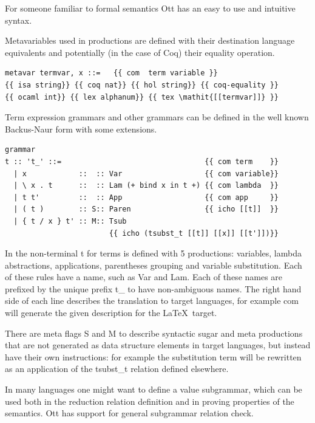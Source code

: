 \documentclass[12pt,twoside,notitlepage]{report}
\theoremstyle{plain}%
\theoremstyle{definition}
\theoremstyle{remark}
\begin{document}
For someone familiar to formal semantics Ott has an easy to use and intuitive syntax. 

Metavariables used in productions are defined with their destination language equivalents and potentially (in the case of Coq) their equality operation.

\begin{lstlisting}[language={Ott}, caption={Ott metavariable definition}]
metavar termvar, x ::=   {{ com  term variable }} 
{{ isa string}} {{ coq nat}} {{ hol string}} {{ coq-equality }}
{{ ocaml int}} {{ lex alphanum}} {{ tex \mathit{[[termvar]]} }}
\end{lstlisting}


Term expression grammars and other grammars can be defined in the well known Backus-Naur form with some extensions.


\begin{lstlisting}[language={Ott}, caption={Ott grammar example}, label={lst:ottgrammarex}]
grammar
t :: 't_' ::=                                 {{ com term    }}
  | x            ::  :: Var                   {{ com variable}}
  | \ x . t      ::  :: Lam (+ bind x in t +) {{ com lambda  }}
  | t t'         ::  :: App                   {{ com app     }}
  | ( t )        :: S:: Paren                 {{ icho [[t]]  }} 
  | { t / x } t' :: M:: Tsub  
                        {{ icho (tsubst_t [[t]] [[x]] [[t']])}}
\end{lstlisting}


In  the non-terminal t for terms is defined with 5 productions: variables, lambda abstractions, applications, parentheses grouping and variable substitution. Each of these rules have a name, such as Var and Lam. Each of these names are prefixed by the unique prefix t\_ to have non-ambiguous names. The right hand side of each line describes the translation to target languages, for example com will  generate the given description for the \LaTeX\, target. 

There are meta flags S and M to describe syntactic sugar and meta productions that are not generated as data structure elements in target languages, but instead have their own instructions: for example the substitution term will be rewritten as an application of the tsubst\_t relation defined elsewhere. 

In many languages one might want to define a value subgrammar, which can be used both in the reduction relation definition and in proving properties of the semantics. Ott has support for general subgrammar relation check.
\end{document}
